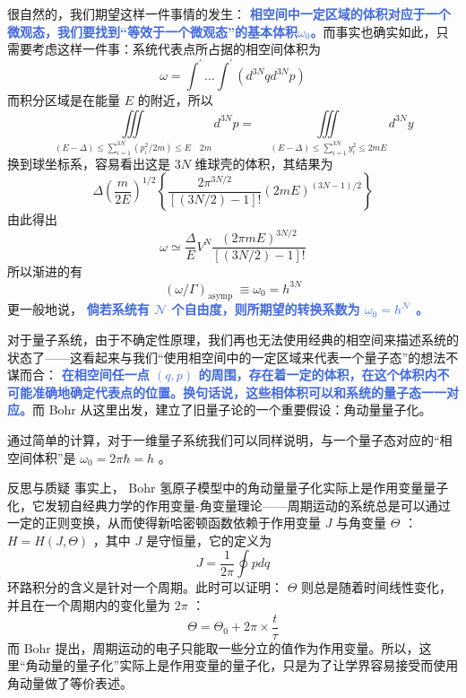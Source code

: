 \documentclass[hyperref,UTF-8]{ctexbook}
\newcommand{\0}{\boldsymbol{0}}
\begin{document}
很自然的，我们期望这样一件事情的发生： \textcolor{RoyalBlue}{\textbf{\kaishu 相空间中一定区域的体积对应于一个微观态，我们要找到“等效于一个微观态”的基本体积$\omega_0$。}}而事实也确实如此，只需要考虑这样一件事：系统代表点所占据的相空间体积为
\begin{equation}
    \omega=\int^{\prime} \ldots \int^{\prime}\left(d^{3 N} q d^{3 N} p\right)
\end{equation}
而积分区域是在能量 $E$ 的附近，所以
\[
    \iiint\limits_{(E-\Delta) \leq \sum_{i=1}^{3 N}\left(p_i^2 / 2 m\right) \leq E \quad 2 m} d^{3 N} p=\quad \iiint\limits_{(E-\Delta) \leq \sum_{i=1}^{3 N} y_i^2 \leq 2 m E
    } d^{3 N} y
\]
换到球坐标系，容易看出这是 $3N$ 维球壳的体积，其结果为
\[
    \Delta\left(\frac{m}{2 E}\right)^{1 / 2}\left\{\frac{2 \pi^{3 N / 2}}{[(3 N / 2)-1] !}(2 m E)^{(3 N-1) / 2}\right\}
\]
由此得出
\[
    \omega \simeq \frac{\Delta}{E} V^N \frac{(2 \pi m E)^{3 N / 2}}{[(3 N / 2)-1] !}
\]
所以渐进的有
\begin{equation}
    (\omega / \Gamma)_{\text {asymp }} \equiv \omega_0=h^{3 N}
\end{equation}
更一般地说， \textcolor{RoyalBlue}{\textbf{\kaishu 倘若系统有 $\mathcal{N}$ 个自由度，则所期望的转换系数为 $\omega_0 = h^{\mathcal{N}}$ 。}}

对于量子系统，由于不确定性原理，我们再也无法使用经典的相空间来描述系统的状态了——这看起来与我们“使用相空间中的一定区域来代表一个量子态”的想法不谋而合： \textcolor{RoyalBlue}{\textbf{\kaishu  在相空间任一点 $(q,p)$ 的周围，存在着一定的体积，在这个体积内不可能准确地确定代表点的位置。换句话说，这些相体积可以和系统的量子态一一对应。}}而 Bohr 从这里出发，建立了旧量子论的一个重要假设：角动量量子化。

通过简单的计算，对于一维量子系统我们可以同样说明，与一个量子态对应的“相空间体积”是 $\omega_0 = 2\pi \hbar = h$ 。

\begin{justification}{\kaishu 反思与质疑}
\kaishu \fontsize{11pt}{16pt}
\quad\quad 事实上， Bohr 氢原子模型中的角动量量子化实际上是作用变量量子化，它发轫自经典力学的作用变量-角变量理论——周期运动的系统总是可以通过一定的正则变换，从而使得新哈密顿函数依赖于作用变量 $J$ 与角变量 $\Theta$ ：$H = H(J,\Theta)$ ，其中 $J$ 是守恒量，它的定义为
\[
    J = \frac{1}{2\pi} \oint pdq
\]
环路积分的含义是针对一个周期。此时可以证明： $\Theta$ 则总是随着时间线性变化，并且在一个周期内的变化量为 $2\pi$ ：
\[
    \Theta = \Theta_0 + 2\pi \times \frac{t}{\tau} 
\]
而 Bohr 提出，周期运动的电子只能取一些分立的值作为作用变量。所以，这里“角动量的量子化”实际上是作用变量的量子化，只是为了让学界容易接受而使用角动量做了等价表述。
\end{justification}
\end{document}
